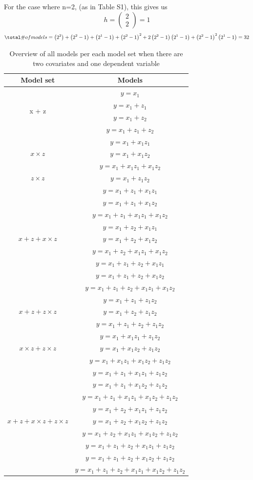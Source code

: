 For the case where n=2, (as in Table S1), this gives us
\[h=\left( \begin{array}{c}
2 \\ 
2 \end{array}
\right)=1\] 
\[\total \# of models=\left(2^2\right)+\left(2^2-1\right)+\left(2^1-1\right)+{\left(2^2-1\right)}^2+2\left(2^2-1\right)\left(2^1-1\right)+{\left(2^2-1\right)}^2\left(2^1-1\right)=32\] 

\begin{table}[hbt!]
\caption{}
\caption*{\footnotesize Overview of all models per each model set when there are two covariates and one dependent variable}
\centering
\begin{tabular}{cc}
\toprule
Model set & Models \\  
\midrule
\multirow{4}{*}{x + z} & $y=x_1$ \\ & $y=x_1+z_1$ \\ & $y=x_1+z_2$ \\ & $y=x_1+z_1+z_2$ & \\ 
\multirow{3}{*}{$x \times z$} & $y=x_1+x_1z_1$ \\ & $y=x_1+x_1z_2$ \\ & $y=x_1+x_1z_1+x_1z_2$ & \\
$z \times z$ & $y=x_1+z_1z_2$ & \\ 
\multirow{9}{*}{$x + z + x \times z$} & $y=x_1+z_1+x_1z_1$\\ & $y=x_1+z_1+x_1z_2$\\ & $y=x_1+z_1+x_1z_1+x_1z_2$\\ & $y=x_1+z_2+x_1z_1$\\ & $y=x_1+z_2+x_1z_2$\\ & $y=x_1+z_2+x_1z_1+x_1z_2$\\ & $y=x_1+z_1+z_2+x_1z_1$\\ & $y=x_1+z_1+z_2+x_1z_2$\\ & $y=x_1+z_1+z_2+x_1z_1+x_1z_2$ & \\ 
\multirow{3}{*}{$x + z + z \times z$} & $y=x_1+z_1+z_1z_2$\\ & $y=x_1+z_2+z_1z_2$\\ & $y=x_1+z_1+z_2+z_1z_2$ & \\
\multirow{3}{*}{$x \times z + z \times z$} & $y=x_1+x_1z_1+z_1z_2$\\ & $y=x_1+x_1z_2+z_1z_2$\\ & $y=x_1+x_1z_1+x_1z_2+z_1z_2$ & \\
\multirow{9}{*}{$x + z + x \times z + z \times z$} & $y=x_1+z_1+x_1z_1+z_1z_2$\\ & $y=x_1+z_1+x_1z_2+z_1z_2$\\ & $y=x_1+z_1+x_1z_1+x_1z_2+z_1z_2$\\ & $y=x_1+z_2+x_1z_1+z_1z_2$\\ & $y=x_1+z_2+x_1z_2+z_1z_2$\\ & $y=x_1+z_2+x_1z_1+x_1z_2+z_1z_2$\\ & $y=x_1+z_1+z_2+x_1z_1+z_1z_2$\\ & $y=x_1+z_1+z_2+x_1z_2+z_1z_2$\\ & $y=x_1+z_1+z_2+x_1z_1+x_1z_2+z_1z_2$ \\ 
\bottomrule
\end{tabular}
\end{table}
\newpage

